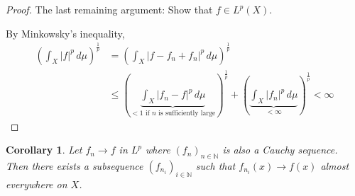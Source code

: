 \documentclass{article}
\newtheorem*{corollary}{Corollary}%
\newcommand{\card}[1]{\left|#1\right|}
\begin{document}
\begin{proof}
  The last remaining argument: Show that $f \in L^p(X)$.

  By Minkowsky's inequality, 
  \begin{align*}
    \left(\int_X \card{f}^p \, d\mu\right)^{\frac1p} &= \left(\int_X \card{f - f_n + f_n}^p \, d\mu\right)^{\frac1p} \\
      &\leq \left(\underbrace{\int_X \card{f_n - f}^p \, d\mu}_{<1 \text{ if $n$ is sufficiently large}}\right)^{\frac1p} + \left(\underbrace{\int_X \card{f_n}^p \, d\mu}_{<\infty}\right)^{\frac1p} < \infty
  \end{align*}
\end{proof}

\begin{corollary}
  Let $f_n \to f$ in $L^p$ where $(f_n)_{n \in \mathbb N}$ is also a Cauchy sequence.
  Then there exists a subsequence $(f_{n_i})_{i \in \mathbb N}$ such that $f_{n_i}(x) \to f(x)$ almost everywhere on $X$.
\end{corollary}

\printindex
\end{document}
